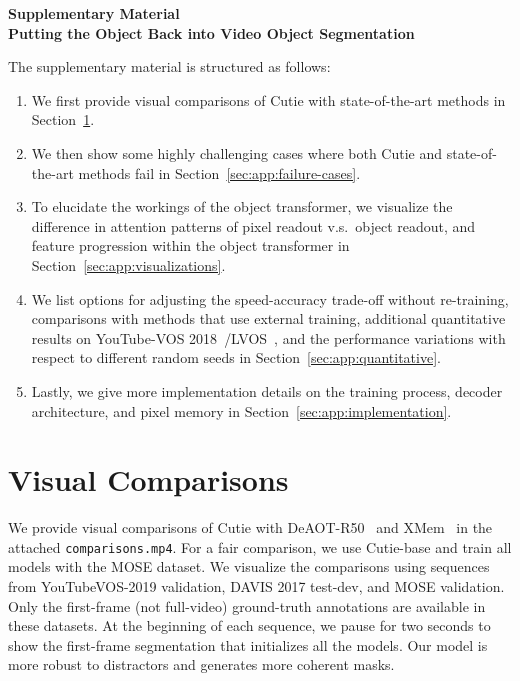 \appendix
\beginsupplement
\onecolumn

\begin{center}
    \Large\textbf{Supplementary Material\\Putting the Object Back into Video Object Segmentation}
\end{center}

The supplementary material is structured as follows:

\begin{enumerate}
    \item We first provide visual comparisons of Cutie with state-of-the-art methods in Section~\ref{sec:app:visual-comparisons}.
    \item We then show some highly challenging cases where both Cutie and state-of-the-art methods fail in Section~\ref{sec:app:failure-cases}.
    \item To elucidate the workings of the object transformer, we visualize the difference in attention patterns of pixel readout v.s.\ object readout, and feature progression within the object transformer in Section~\ref{sec:app:visualizations}.
    \item We list options for adjusting the speed-accuracy trade-off without re-training, comparisons with methods that use external training, additional quantitative results on YouTube-VOS 2018~\cite{xu2018youtubeVOS}/LVOS~\cite{hong2022lvos}, and the performance variations with respect to different random seeds in Section~\ref{sec:app:quantitative}.
    \item Lastly, we give more implementation details on the training process, decoder architecture, and pixel memory in Section~\ref{sec:app:implementation}.
\end{enumerate}

\section{Visual Comparisons}\label{sec:app:visual-comparisons}
We provide visual comparisons of Cutie with DeAOT-R50~\cite{yang2022decoupling} and XMem~\cite{cheng2022xmem} in the attached {\tt comparisons.mp4}.
For a fair comparison, we use Cutie-base and train all models with the MOSE dataset.
We visualize the comparisons using sequences from YouTubeVOS-2019 validation, DAVIS 2017 test-dev, and MOSE validation. 
Only the first-frame (not full-video) ground-truth annotations are available in these datasets. 
At the beginning of each sequence, we pause for two seconds to show the first-frame segmentation that initializes all the models.
Our model is more robust to distractors and generates more coherent masks.

